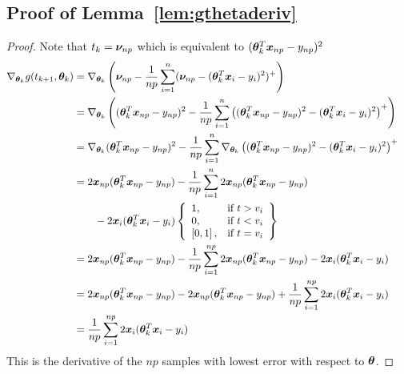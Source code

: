 \documentclass{article} %
\begin{document}
\begin{appendices}
	\subsection{Proof of Lemma~\ref{lem:gthetaderiv}}
	\label{app:gthetaderiv}
	\begin{proof}
		Note that $t_k = {\bm{\nu}}_{np}$ which is equivalent to $({\bm{\theta}}_k^T{\bm{x}}_{np} - y_{np})^2$
		\begin{align}
			\nabla_{{\bm{\theta}}_k} g(t_{k+1},{\bm{\theta}}_k) &= \nabla_{{\bm{\theta}}_k}\left({\bm{\nu}}_{np} - \frac{1}{np}\sum_{i=1}^n({\bm{\nu}}_{np} - ({\bm{\theta}}_k^T{\bm{x}}_i - y_i)^2)^+\right) &&\\
			&= \nabla_{{\bm{\theta}}_k}\left(({\bm{\theta}}_k^T{\bm{x}}_{np}-y_{np})^2 - \frac{1}{np}\sum_{i=1}^n\left(({\bm{\theta}}_k^T{\bm{x}}_{np} - y_{np})^2 - ({\bm{\theta}}_k^T{\bm{x}}_i - y_i)^2\right)^+\right) &&\\
			&= \nabla_{{\bm{\theta}}_k}({\bm{\theta}}_k^T{\bm{x}}_{np}-y_{np})^2 - \frac{1}{np}\sum_{i=1}^n\nabla_{{\bm{\theta}}_k}\left(({\bm{\theta}}_k^T{\bm{x}}_{np} - y_{np})^2 - ({\bm{\theta}}_k^T{\bm{x}}_i - y_i)^2\right)^+ &&\\				
			&= 2{\bm{x}}_{np}({\bm{\theta}}_k^T{\bm{x}}_{np} - y_{np}) -\frac{1}{np}\sum_{i=1}^{n}2{\bm{x}}_{np}({\bm{\theta}}_k^T{\bm{x}}_{np} - y_{np}) \notag\\ &\qquad-2{\bm{x}}_i({\bm{\theta}}_k^T{\bm{x}}_i - y_i) \left\{
			\begin{array}{lr}
				1, & \text{if } t > v_i\\
				0, & \text{if } t < v_i \\
				\left[0,1\right], & \text{if } t = v_i \\
			\end{array} \right\} &&\\
			&= 2{\bm{x}}_{np}({\bm{\theta}}_k^T{\bm{x}}_{np} - y_{np}) -\frac{1}{np}\sum_{i=1}^{np}2{\bm{x}}_{np}({\bm{\theta}}_k^T{\bm{x}}_{np} - y_{np}) -2{\bm{x}}_i({\bm{\theta}}_k^T{\bm{x}}_i - y_i) &&\\	
			&= 2{\bm{x}}_{np}({\bm{\theta}}_k^T{\bm{x}}_{np} - y_{np}) - 2{\bm{x}}_{np}({\bm{\theta}}_k^T{\bm{x}}_{np} - y_{np}) + \frac{1}{np}\sum_{i=1}^{np}2{\bm{x}}_i({\bm{\theta}}_k^T{\bm{x}}_i - y_i) &&\\
			&= \frac{1}{np}\sum_{i=1}^{np}2{\bm{x}}_i({\bm{\theta}}_k^T{\bm{x}}_i - y_i)&&
		\end{align}
	This is the derivative of the $np$ samples with lowest error with respect to ${\bm{\theta}}$.
	\end{proof}
	

\end{appendices}
\end{document}
